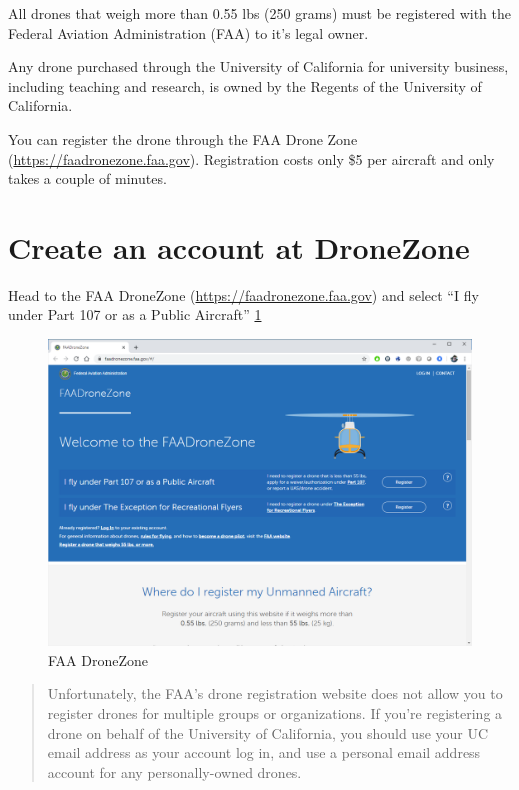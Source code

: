 \documentclass[
]{book}
\begin{document}
All drones that weigh more than 0.55 lbs (250 grams) must be registered with the Federal Aviation Administration (FAA) to it's legal owner.

Any drone purchased through the University of California for university business, including teaching and research, is owned by the Regents of the University of California.

You can register the drone through the FAA Drone Zone (\url{https://faadronezone.faa.gov}). Registration costs only \$5 per aircraft and only takes a couple of minutes.

\hypertarget{create-an-account-at-dronezone}{%
\section{Create an account at DroneZone}\label{create-an-account-at-dronezone}}

Head to the FAA DroneZone (\url{https://faadronezone.faa.gov}) and select ``I fly under Part 107 or as a Public Aircraft'' \ref{fig:reg-page}

\begin{figure}

{\centering \includegraphics[width=0.8\linewidth]{images/reg_site} 

}

\caption{FAA DroneZone}\label{fig:reg-page}
\end{figure}

\begin{quote}
Unfortunately, the FAA's drone registration website does not allow you to register drones for multiple groups or organizations. If you're registering a drone on behalf of the University of California, you should use your UC email address as your account log in, and use a personal email address account for any personally-owned drones.
\end{quote}
\end{document}
